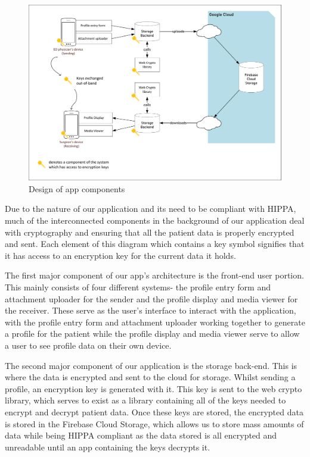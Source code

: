 \documentclass[11pt,letterpaper]{article}
\begin{document}
\begin{landscape}
\begin{figure}
    \centering
    \includegraphics[width=8in]{static-design.pdf}
    \caption{Design of app components}
    \label{fig:static-design}
\end{figure}
\end{landscape}

Due to the nature of our application and its need to be compliant with HIPPA, much of the interconnected components in the background of our application deal with cryptography and ensuring that all the patient data is properly encrypted and sent. Each element of this diagram which contains a key symbol signifies that it has access to an encryption key for the current data it holds.

The first major component of our app's architecture is the front-end user portion. This mainly consists of four different systems- the profile entry form and attachment uploader for the sender and the profile display and media viewer for the receiver. These serve as the user's interface to interact with the application, with the profile entry form and attachment uploader working together to generate a profile for the patient while the profile display and media viewer serve to allow a user to see profile data on their own device. 

The second major component of our application is the storage back-end. This is where the data is encrypted and sent to the cloud for storage. Whilst sending a profile, an encryption key is generated with it. This key is sent to the web crypto library, which serves to exist as a library containing all of the keys needed to encrypt and decrypt patient data. Once these keys are stored, the encrypted data is stored in the Firebase Cloud Storage, which allows us to store mass amounts of data while being HIPPA compliant as the data stored is all encrypted and unreadable until an app containing the keys decrypts it. 
\end{document}
